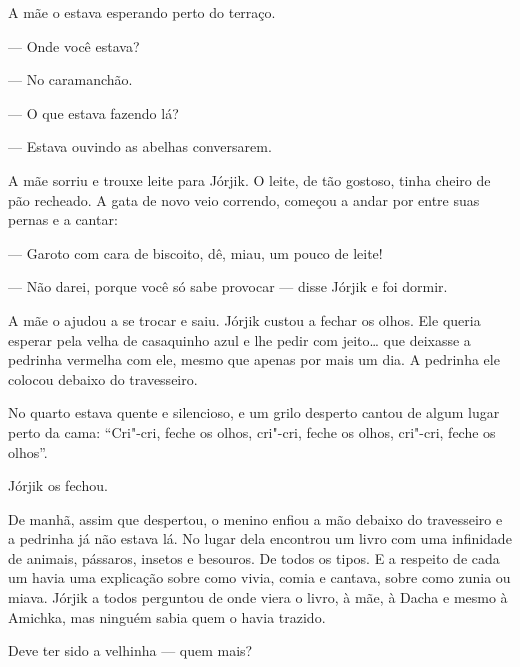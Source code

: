 A mãe o estava esperando perto do terraço.

--- Onde você estava?

--- No caramanchão.

--- O que estava fazendo lá?

--- Estava ouvindo as abelhas conversarem.

A mãe sorriu e trouxe leite para Jórjik. O leite, de tão gostoso, tinha
cheiro de pão recheado. A gata de novo veio correndo, começou a andar
por entre suas pernas e a cantar:

--- Garoto com cara de biscoito, dê, miau, um pouco de leite!

--- Não darei, porque você só sabe provocar --- disse Jórjik e foi
dormir.

A mãe o ajudou a se trocar e saiu. Jórjik custou a fechar os olhos. Ele
queria esperar pela velha de casaquinho azul e lhe pedir com jeito\ldots{}
que deixasse a pedrinha vermelha com ele, mesmo que apenas por mais um
dia. A pedrinha ele colocou debaixo do travesseiro.

No quarto estava quente e silencioso, e um grilo desperto cantou de
algum lugar perto da cama: ``Cri"-cri, feche os olhos, cri"-cri, feche os
olhos, cri"-cri, feche os olhos''.

Jórjik os fechou.

De manhã, assim que despertou, o menino enfiou a mão debaixo do
travesseiro e a pedrinha já não estava lá. No lugar dela encontrou um
livro com uma infinidade de animais, pássaros, insetos e besouros. De
todos os tipos. E a respeito de cada um havia uma explicação sobre como
vivia, comia e cantava, sobre como zunia ou miava. Jórjik a todos
perguntou de onde viera o livro, à mãe, à Dacha e mesmo à Amichka, mas
ninguém sabia quem o havia trazido.

Deve ter sido a velhinha --- quem mais?

